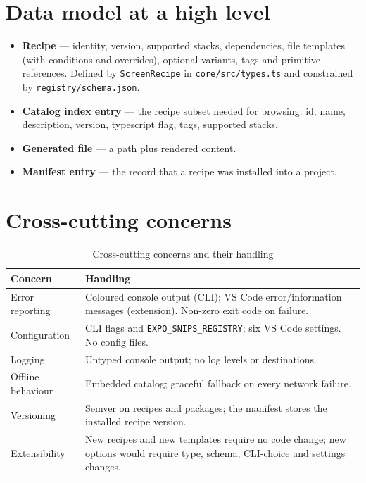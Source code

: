 \section{Data model at a high level}

\begin{itemize}
  \item \textbf{Recipe} --- identity, version, supported stacks, dependencies,
        file templates (with conditions and overrides), optional variants, tags and
        primitive references. Defined by \texttt{ScreenRecipe} in
        \texttt{core/src/types.ts} and constrained by \texttt{registry/schema.json}.
  \item \textbf{Catalog index entry} --- the recipe subset needed for browsing:
        id, name, description, version, typescript flag, tags, supported stacks.
  \item \textbf{Generated file} --- a path plus rendered content.
  \item \textbf{Manifest entry} --- the record that a recipe was installed into a
        project.
\end{itemize}

\section{Cross-cutting concerns}

\begin{longtable}{p{3.6cm}p{10.4cm}}
\caption{Cross-cutting concerns and their handling}\\
\toprule
\textbf{Concern} & \textbf{Handling} \\
\midrule

Error reporting & Coloured console output (CLI); VS Code error/information messages (extension). Non-zero exit code on failure. \\
Configuration & CLI flags and \texttt{EXPO\_SNIPS\_REGISTRY}; six VS Code settings. No config files. \\
Logging & Untyped console output; no log levels or destinations. \\
Offline behaviour & Embedded catalog; graceful fallback on every network failure. \\
Versioning & Semver on recipes and packages; the manifest stores the installed recipe version. \\
Extensibility & New recipes and new templates require no code change; new options would require type, schema, CLI-choice and settings changes. \\
\bottomrule
\end{longtable}

